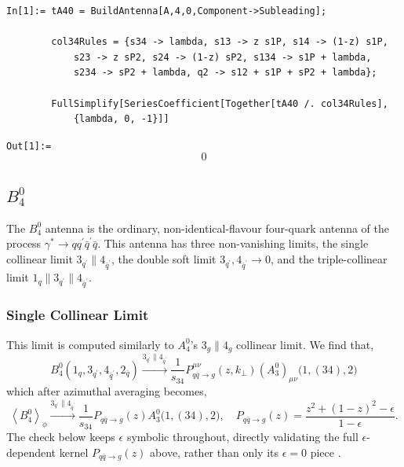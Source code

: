 \begin{mdframed}[backgroundcolor=gray!10, linewidth=0pt]
\begin{lstlisting}
In[1]:= tA40 = BuildAntenna[A,4,0,Component->Subleading];

        col34Rules = {s34 -> lambda, s13 -> z s1P, s14 -> (1-z) s1P,
            s23 -> z sP2, s24 -> (1-z) sP2, s134 -> s1P + lambda,
            s234 -> sP2 + lambda, q2 -> s12 + s1P + sP2 + lambda};

        FullSimplify[SeriesCoefficient[Together[tA40 /. col34Rules],
            {lambda, 0, -1}]]
\end{lstlisting}
\texttt{Out[1]:=}
    \begin{equation*}
        0
    \end{equation*}
\end{mdframed}

\subsection{$B_4^0$}\label{subsec:localValidationB40}

The $B_4^0$ antenna is the ordinary, non-identical-flavour four-quark antenna of the process $\gamma^*\to qq^\prime\bar q^\prime\bar q$.
This antenna has three non-vanishing limits, the single collinear limit $3_{q^\prime}\parallel 4_{\bar q^\prime}$, the double soft limit
$3_{q^\prime},4_{\bar q^\prime}\to 0$, and the triple-collinear limit $1_q\parallel 3_{q^\prime}\parallel 4_{\bar q^\prime}$.

\subsubsection{Single Collinear Limit}

This limit is computed similarly to $A_4^0$'s $3_g\parallel 4_g$ collinear limit. We find that,
\begin{equation}
    B_4^0(1_q,3_{q^\prime},4_{\bar q^\prime},2_{\bar q})\xrightarrow{3_{q^\prime}\parallel 4_{\bar q^\prime}}\frac1{s_{34}}P_{q\bar q\to g}^{\mu\nu}(z,k_\perp)\left(A_3^0\right)_{\mu\nu}\Big(1,(34),2\Big)
\end{equation}
which after azimuthal averaging becomes,
\begin{equation}
    \left\langle B_4^0\right\rangle_\phi \xrightarrow{3_{q^\prime}\parallel 4_{\bar q^\prime}}\frac1{s_{34}} P_{q\bar q\to g}(z)A_3^0\Big(1,(34),2\Big),\quad P_{q\bar q\to g}(z) = \frac{z^2+(1-z)^2-\epsilon}{1-\epsilon}.
\end{equation}
The check below keeps $\epsilon$ symbolic throughout, directly validating the full $\epsilon$-dependent
kernel $P_{q\bar q\to g}(z)$ above, rather than only its $\epsilon=0$ piece \cite{Gehrmann-DeRidder:2005btv}.

